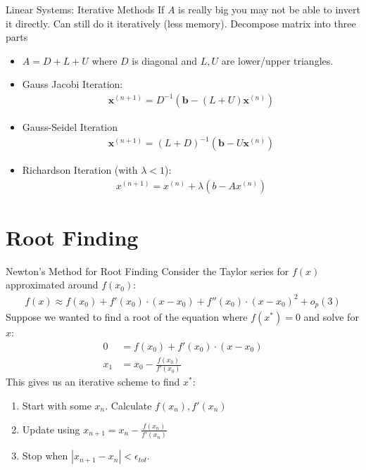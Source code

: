 \documentclass[aspectratio=169,11pt]{beamer}
\begin{document}
\begin{frame}{Linear Systems: Iterative Methods}
If $A$ is really big you may not be able to invert it directly. Can still do it iteratively (less memory). Decompose matrix into three parts
\begin{itemize}
\item $A = D + L + U$ where $D$ is diagonal and $L,U$ are lower/upper triangles.
\item Gauss Jacobi Iteration:
\begin{align*}
\symbf{x}^{(n+1)}=D^{-1}\left(\symbf{b}-(L+U) \symbf{x}^{(n)}\right)
\end{align*}
\item Gauss-Seidel Iteration
\begin{align*}
\symbf{x}^{(n+1)}=(L+D)^{-1}\left(\symbf{b}-U \symbf{x}^{(n)}\right)
\end{align*}
\item Richardson Iteration (with $\lambda < 1$):
\begin{align*}
x^{(n+1)}=x^{(n)}+\lambda \left(b-A x^{(n)}\right)
\end{align*}
\end{itemize}
\end{frame}





\section{Root Finding} 

\begin{frame}{Newton's Method for Root Finding}
Consider the Taylor series for $f(x)$ approximated around $f(x_0)$:
\begin{align*}
f(x) \approx f(x_0) + f'(x_0) \cdot (x-x_0) + f''(x_0) \cdot (x-x_0)^2 + o_p(3)
\end{align*}
Suppose we wanted to find a \alert{root} of the equation where $f(x^{*})=0$ and solve for $x$:
\begin{align*}
0 &= f(x_0) + f'(x_0) \cdot (x-x_0) \\
x_1 &= x_0-\frac{f(x_0)}{f'(x_0)} 
\end{align*}
This gives us an \alert{iterative} scheme to find $x^{*}$:
\begin{enumerate}
\item Start with some $x_n$. Calculate $f(x_n),f'(x_n)$
\item Update using $x_{n+1} = x_n - \frac{f(x_n)}{f'(x_n)} $
\item Stop when $|x_{n+1}-x_{n}| < \epsilon_{tol}$.
\end{enumerate}
\end{frame}
\end{document}
